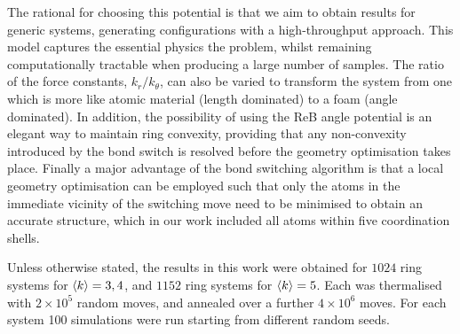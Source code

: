 The rational for choosing this potential is that we aim to obtain results for generic systems, generating configurations with a high-throughput approach.
This model captures the essential physics the problem, whilst remaining computationally tractable when producing a large number of samples.
The ratio of the force constants, $k_r/k_\theta$, can also be varied to transform the system from one which is more like atomic material (length dominated) to a foam (angle dominated).
In addition, the possibility of using the ReB angle potential is an elegant way to maintain ring convexity, providing that any non-convexity introduced by the bond switch is resolved before the geometry optimisation takes place.
Finally a major advantage of the bond switching algorithm is that a local geometry optimisation can be employed such that only the atoms in the immediate vicinity of the switching move need to be minimised to obtain an accurate structure\cite{Mousseau2001}, which in our work included all atoms within five coordination shells.

Unless otherwise stated, the results in this work were obtained for $1024$ ring systems for $\langle k \rangle=3,4$, and $1152$ ring systems for $\langle k \rangle=5$. Each was thermalised with $2\times 10^5$ random moves, and annealed over a further $4\times 10^6$  moves. For each system 100 simulations were run starting from different random seeds.




